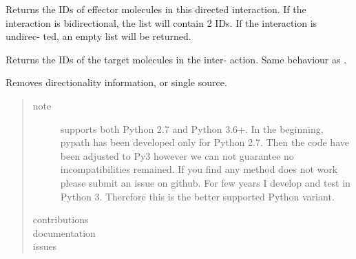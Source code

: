 \documentclass[letterpaper,10pt,english]{sphinxmanual}
\begin{document}
\begin{fulllineitems}
\begin{fulllineitems}
\end{fulllineitems}


\begin{fulllineitems}
\label{\detokenize{main:pypath.main.Direction.src}}
Returns the IDs of effector molecules in this directed
interaction. If the interaction is bidirectional, the
list will contain 2 IDs. If the interaction is undirec-
ted, an empty list will be returned.

\end{fulllineitems}


\begin{fulllineitems}
\label{\detokenize{main:pypath.main.Direction.tgt}}
Returns the IDs of the target molecules in the inter-
action. Same behaviour as .

\end{fulllineitems}


\begin{fulllineitems}
\label{\detokenize{main:pypath.main.Direction.unset_dir}}
Removes directionality information,
or single source.

\end{fulllineitems}


\end{fulllineitems}

\begin{quote}\begin{description}
\item[{note}] \leavevmode
{} supports both Python 2.7 and Python 3.6+. In the beginning,
pypath has been developed only for Python 2.7. Then the code have been
adjusted to Py3 however we can not guarantee no incompatibilities
remained. If you find any method does not work please submit an issue on
github. For few years I develop and test  in Python 3. Therefore
this is the better supported Python variant.

\item[{contributions}] \leavevmode
{}

\item[{documentation}] \leavevmode
{}

\item[{issues}] \leavevmode
{}

\end{description}\end{quote}
\end{document}

